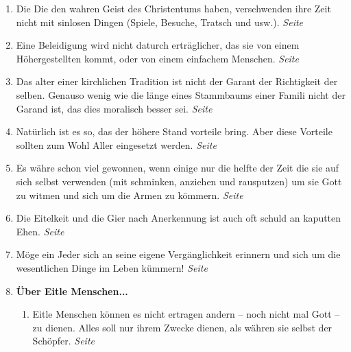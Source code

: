 \begin{enumerate}
 \item Die Die den wahren Geist des Christentums haben, verschwenden ihre Zeit
nicht mit sinlosen Dingen (Spiele, Besuche, Tratsch und usw.).
 \dotfill \textit{Seite \pageref{ref:10_08_zeitvertreib}}\\
 
 \item Eine Beleidigung wird nicht daturch erträglicher, das sie von einem
Höhergestellten kommt, oder von einem einfachem Menschen.
 \dotfill \textit{Seite \pageref{ref:11_03_beleidigung}}\\
 
 \item Das alter einer kirchlichen Tradition ist nicht der Garant der
Richtigkeit der selben. Genauso wenig wie die länge eines Stammbaums einer
Famili nicht der Garand ist, das dies moralisch besser sei.
 \dotfill \textit{Seite \pageref{ref:11_04_abstammung}}\\
 
 \item Natürlich ist es so, das der höhere Stand vorteile bring. Aber diese
Vorteile sollten zum Wohl Aller eingesetzt werden.
 \dotfill \textit{Seite \pageref{ref:11_07_standesvorteil}}\\
 
 \item Es währe schon viel gewonnen, wenn einige nur die helfte der Zeit die sie
auf sich selbst verwenden (mit schminken, anziehen und rausputzen) um sie Gott
zu witmen und sich um die Armen zu kömmern.
 \dotfill \textit{Seite \pageref{ref:11_09_putzsucht}}\\
 
 \item Die Eitelkeit und die Gier nach Anerkennung ist auch oft schuld an
kaputten Ehen.
 \dotfill \textit{Seite \pageref{ref:11_09_kaputte_ehen}}\\
 
 \item Möge ein Jeder sich an seine eigene Vergänglichkeit erinnern und sich um
die wesentlichen Dinge im Leben kümmern!
 \dotfill \textit{Seite
\pageref{ref:11_10_juengstes_gericht}}\\

 \item \textbf{Über Eitle Menschen...}
 
\begin{enumerate} 
 \item Eitle Menschen können es nicht ertragen andern -- noch nicht mal Gott --
zu dienen. Alles soll nur ihrem Zwecke dienen, als währen sie selbst der
Schöpfer.
 \dotfill \textit{Seite \pageref{ref:12_01_egoisten}}\\


\end{enumerate}
\end{enumerate}
